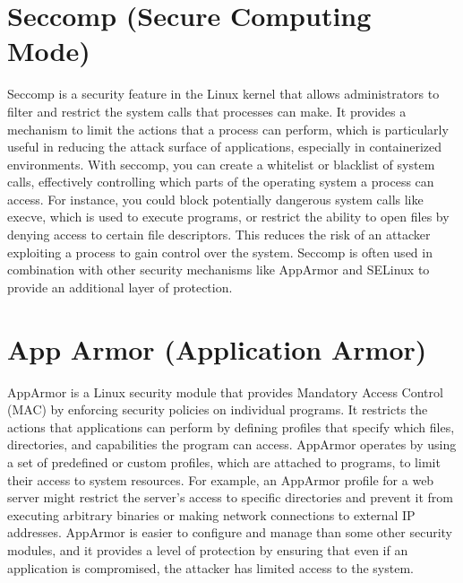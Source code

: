 \documentclass[12pt]{report}
\begin{document}
\begin{doublespace}
\section{Seccomp (Secure Computing Mode)}
Seccomp is a security feature in the Linux kernel that allows administrators to filter and restrict the system calls that processes can make. It provides a mechanism to limit the actions that a process can perform, which is particularly useful in reducing the attack surface of applications, especially in containerized environments. With seccomp, you can create a whitelist or blacklist of system calls, effectively controlling which parts of the operating system a process can access. For instance, you could block potentially dangerous system calls like execve, which is used to execute programs, or restrict the ability to open files by denying access to certain file descriptors. This reduces the risk of an attacker exploiting a process to gain control over the system. Seccomp is often used in combination with other security mechanisms like AppArmor and SELinux to provide an additional layer of protection.

\section{App Armor (Application Armor)}
AppArmor is a Linux security module that provides Mandatory Access Control (MAC) by enforcing security policies on individual programs. It restricts the actions that applications can perform by defining profiles that specify which files, directories, and capabilities the program can access. AppArmor operates by using a set of predefined or custom profiles, which are attached to programs, to limit their access to system resources. For example, an AppArmor profile for a web server might restrict the server’s access to specific directories and prevent it from executing arbitrary binaries or making network connections to external IP addresses. AppArmor is easier to configure and manage than some other security modules, and it provides a level of protection by ensuring that even if an application is compromised, the attacker has limited access to the system.


\end{doublespace}
\end{document}
